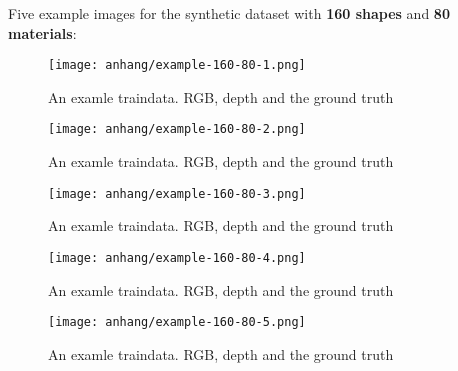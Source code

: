 	\FloatBarrier
	\clearpage
	Five example images for the synthetic dataset with \textbf{160 shapes} and \textbf{80 materials}:
	\begin{figure}[H]
		\centering
		\texttt{[image: anhang/example-160-80-1.png]}
		\caption[An examle traindata. RGB, depth and the ground truth]{An examle traindata. RGB, depth and the ground truth}
	\end{figure}
	\begin{figure}[H]
		\centering
		\texttt{[image: anhang/example-160-80-2.png]}
		\caption[An examle traindata. RGB, depth and the ground truth]{An examle traindata. RGB, depth and the ground truth}
	\end{figure}
	\begin{figure}[H]
		\centering
		\texttt{[image: anhang/example-160-80-3.png]}
		\caption[An examle traindata. RGB, depth and the ground truth]{An examle traindata. RGB, depth and the ground truth}
	\end{figure}
	\begin{figure}[H]
		\centering
		\texttt{[image: anhang/example-160-80-4.png]}
		\caption[An examle traindata. RGB, depth and the ground truth]{An examle traindata. RGB, depth and the ground truth}
	\end{figure}
	\begin{figure}[H]
		\centering
		\texttt{[image: anhang/example-160-80-5.png]}
		\caption[An examle traindata. RGB, depth and the ground truth]{An examle traindata. RGB, depth and the ground truth}
	\end{figure}
	
